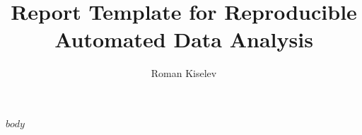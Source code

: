 \documentclass[a4paper]{scrartcl}
\title{Report Template for Reproducible Automated Data Analysis}
\author{Roman Kiselev}
\begin{document}
    \maketitle

    $body$

    \tableofcontents
    
    
\end{document}
